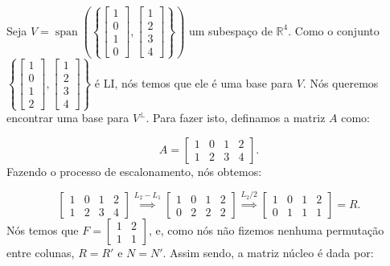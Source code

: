 \begin{Example}
	Seja $V = \operatorname{span}\left(\left\{\begin{bmatrix}
		1 \\
		0 \\
		1 \\
		0
	\end{bmatrix}, \begin{bmatrix}
		1 \\
		2 \\
		3 \\
		4
	\end{bmatrix}\right\}\right)$ um subespaço de $\mathbb{R}^4$. Como o conjunto $\left\{\begin{bmatrix}
		1 \\
		0 \\
		1 \\
		2
	\end{bmatrix}, \begin{bmatrix}
		1 \\
		2 \\
		3 \\
		4
	\end{bmatrix}\right\}$ é LI, nós temos que ele é uma base para $V$. Nós queremos encontrar uma base para $V^\perp$. Para fazer isto, definamos a matriz $A$ como:
	
	$$
	A = \begin{bmatrix}
		1 & 0 & 1 & 2 \\
		1 & 2 & 3 & 4
	\end{bmatrix}.
	$$
	Fazendo o processo de escalonamento, nós obtemos:
	
	$$
	\begin{bmatrix}
		1 & 0 & 1 & 2 \\
		1 & 2 & 3 & 4
	\end{bmatrix}\overset{L_2 - L_1}{\implies}\begin{bmatrix}
		1 & 0 & 1 & 2 \\
		0 & 2 & 2 & 2
	\end{bmatrix}\overset{L_2/2}{\implies}\begin{bmatrix}
		1 & 0 & 1 & 2 \\
		0 & 1 & 1 & 1
	\end{bmatrix} = R.
	$$
	Nós temos que $F = \begin{bmatrix}
		1 & 2 \\
		1 & 1
	\end{bmatrix}$, e, como nós não fizemos nenhuma permutação entre colunas, $R = R'$ e $N = N'$. Assim sendo, a matriz núcleo é dada por:
	

\end{Example}
